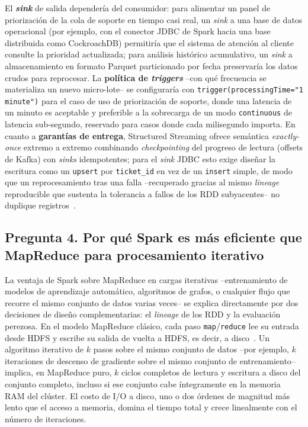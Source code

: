 \documentclass[11pt,a4paper]{article}
\begin{document}
    El \textbf{\emph{sink}} de salida dependería del consumidor: para alimentar un panel de
    priorización de la cola de soporte en tiempo casi real, un \emph{sink} a una base de datos
    operacional (por ejemplo, con el conector JDBC de Spark hacia una base distribuida como
    CockroachDB) permitiría que el sistema de atención al cliente consulte la prioridad actualizada;
    para análisis histórico acumulativo, un \emph{sink} a almacenamiento en formato Parquet
    particionado por fecha preservaría los datos crudos para reprocesar. La \textbf{política de
    \emph{triggers}} --con qué frecuencia se materializa un nuevo micro-lote-- se configuraría con
    \texttt{trigger(processingTime="1 minute")} para el caso de uso de priorización de soporte,
    donde una latencia de un minuto es aceptable y preferible a la sobrecarga de un modo
    \texttt{continuous} de latencia sub-segundo, reservado para casos donde cada milisegundo importa.
    En cuanto a \textbf{garantías de entrega}, Structured Streaming ofrece semántica
    \emph{exactly-once} extremo a extremo combinando \emph{checkpointing} del progreso de lectura
    (offsets de Kafka) con \emph{sinks} idempotentes; para el \emph{sink} JDBC esto exige diseñar la
    escritura como un \texttt{upsert} por \texttt{ticket\_id} en vez de un \texttt{insert} simple,
    de modo que un reprocesamiento tras una falla --recuperado gracias al mismo \emph{lineage}
    reproducible que sustenta la tolerancia a fallos de los RDD subyacentes-- no duplique
    registros~\autocite{zaharia2012}.

    \subsection*{Pregunta 4. Por qué Spark es más eficiente que MapReduce para procesamiento iterativo}

    La ventaja de Spark sobre MapReduce en cargas iterativas --entrenamiento de modelos de
    aprendizaje automático, algoritmos de grafos, o cualquier flujo que recorre el mismo conjunto de
    datos varias veces-- se explica directamente por dos decisiones de diseño complementarias:
    el \emph{lineage} de los RDD y la evaluación perezosa. En el modelo MapReduce clásico, cada
    paso \texttt{map}/\texttt{reduce} lee su entrada desde HDFS y escribe su salida de vuelta a
    HDFS, es decir, a disco~\autocite{dean2008,white2015}. Un algoritmo iterativo de
    $k$ pasos sobre el mismo conjunto de datos --por ejemplo, $k$ iteraciones de descenso de
    gradiente sobre el mismo conjunto de entrenamiento-- implica, en MapReduce puro, $k$ ciclos
    completos de lectura y escritura a disco del conjunto completo, incluso si ese conjunto cabe
    íntegramente en la memoria RAM del clúster. El costo de I/O a disco, uno o dos órdenes de
    magnitud más lento que el acceso a memoria, domina el tiempo total y crece linealmente con el
    número de iteraciones.
\end{document}
